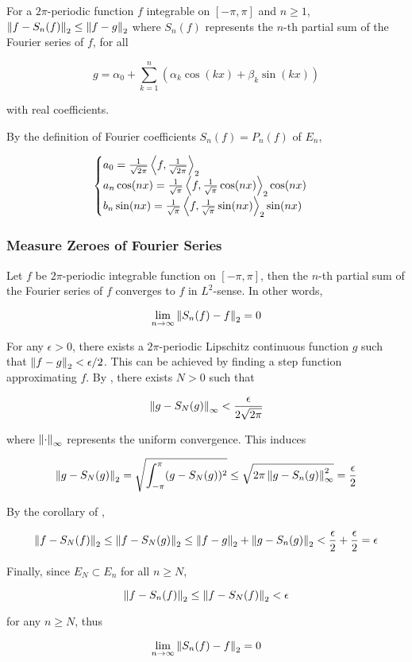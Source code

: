\documentclass[a4paper,12pt]{article}
\begin{document}
\begin{crl}
  For a $2\pi$-periodic function $f$ integrable on $[-\pi,\pi]$ and $n\geq 1$, $\left\| f-S_{n}(f)\right\|_{2}\leq\left\| f-g\right\|_{2}$ where $S_{n}(f)$ represents the $n$-th partial sum of the Fourier series of $f$, for all

  $$g=\alpha_{0}+\sum_{k=1}^{n}(\alpha_{k}\cos(kx)+\beta_{k}\sin(kx))$$\s

  with real coefficients.\n

  \prf By the definition of Fourier coefficients $S_{n}(f)=P_{n}(f)$ of $E_{n}$,

  $$\begin{cases}
    a_{0}=\frac{1}{\sqrt{2\pi}}\left\langle f,\frac{1}{\sqrt{2\pi}}\right\rangle_{2}\\
    a_{n}\cos(nx)=\frac{1}{\sqrt{\pi}}\left\langle f,\frac{1}{\sqrt{\pi}}\cos(nx)\right\rangle_{2}\cos(nx)\\
    b_{n}\sin(nx)=\frac{1}{\sqrt{\pi}}\left\langle f,\frac{1}{\sqrt{\pi}}\sin(nx)\right\rangle_{2}\sin(nx)
  \end{cases}$$
\end{crl}

\propdisp
\subsubsection{Measure Zeroes of Fourier Series}
\begin{thm}
  Let $f$ be $2\pi$-periodic integrable function on $[-\pi,\pi]$, then the $n$-th partial sum of the Fourier series of $f$ converges to $f$ in $L^{2}$-sense. In other words,

  $$\lim_{n\to\infty}\left\| S_{n}(f)-f\right\|_{2}=0$$\s

  \prf For any $\epsilon>0$, there exists a $2\pi$-periodic Lipschitz continuous function $g$ such that $\left\| f-g\right\|_{2}<\epsilon/2$. This can be achieved by finding a step function approximating $f$. By \rpst[\sctd{11}], there exists $N>0$ such that

  $$\left\| g-S_{N}(g)\right\|_{\infty}<\frac{\epsilon}{2\sqrt{2\pi}}$$\s

  where $\left\| \cdot\right\|_{\infty}$ represents the uniform convergence. This induces

  $$\left\| g-S_{N}(g)\right\|_{2}=\sqrt{\int_{-\pi}^{\pi}(g-S_{N}(g))^{2}}\leq\sqrt{2\pi\left\| g-S_{n}(g)\right\|_{\infty}^{2}}=\frac{\epsilon}{2}$$\s

  By the corollary of \rpst[\sctd{1}],

  $$\left\| f-S_{N}(f)\right\|_{2}\leq\left\| f-S_{N}(g)\right\|_{2}\leq\left\| f-g\right\|_{2}+\left\| g-S_{n}(g)\right\|_{2}<\frac{\epsilon}{2}+\frac{\epsilon}{2}=\epsilon$$\s

  Finally, since $E_{N}\subset E_{n}$ for all $n\geq N$,

  $$\left\| f-S_{n}(f)\right\|_{2}\leq\left\| f-S_{N}(f)\right\|_{2}<\epsilon$$\s

  for any $n\geq N$, thus

  $$\lim_{n\to\infty}\left\| S_{n}(f)-f\right\|_{2}=0$$
\end{thm}\n
\end{document}
